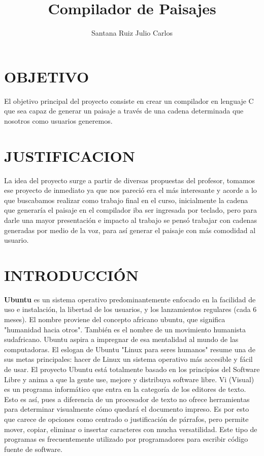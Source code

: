 \documentclass{article}
\title{Compilador de Paisajes}
\author{Santana Ruiz Julio Carlos}
\begin{document}
\maketitle

\tableofcontents

\section{OBJETIVO}

El objetivo principal del proyecto consiste en crear un compilador en lenguaje C que sea capaz de generar un paisaje a través de una cadena determinada que nosotros como usuarios generemos.

\section{JUSTIFICACION}

La idea del proyecto surge a partir de diversas propuestas del profesor, tomamos ese proyecto de inmediato ya que nos pareció era el más interesante y acorde a lo que buscabamos realizar como trabajo final en el curso, inicialmente la cadena que generaría el paisaje en el compilador iba ser ingresada por teclado, pero para darle una mayor presentación e impacto al trabajo se pensó trabajar con cadenas generadas por medio de la voz, para así generar el paisaje con más comodidad al usuario.

\section{INTRODUCCIÓN}

{\bf Ubuntu} es un sistema operativo predominantemente enfocado en la facilidad de uso e instalación, la libertad de los usuarios, y los lanzamientos regulares (cada 6 meses). El nombre proviene del concepto africano ubuntu, que significa "humanidad hacia otros". También es el nombre de un movimiento humanista sudafricano. Ubuntu aspira a impregnar de esa mentalidad al mundo de las computadoras. El eslogan de Ubuntu "Linux para seres humanos" resume una de sus metas principales: hacer de Linux un sistema operativo más accesible y fácil de usar. El proyecto Ubuntu está totalmente basado en los principios del Software Libre y anima a que la gente use, mejore y distribuya software libre.
Vi (Visual) es un programa informático que entra en la categoría de los editores de texto. Esto es así, pues a diferencia de un procesador de texto no ofrece herramientas para determinar visualmente cómo quedará el documento impreso. Es por esto que carece de opciones como centrado o justificación de párrafos, pero permite mover, copiar, eliminar o insertar caracteres con mucha versatilidad. Este tipo de programas es frecuentemente utilizado por programadores para escribir código fuente de software.\\
\end{document}
